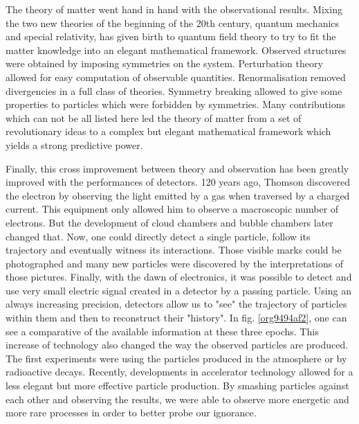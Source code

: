 The theory of matter went hand in hand with the observational results.
Mixing the two new theories of the beginning of the 20th century, quantum mechanics and special relativity, has given birth to quantum field theory to try to fit the matter knowledge into an elegant mathematical framework.
Observed structures were obtained by imposing symmetries on the system.
Perturbation theory allowed for easy computation of observable quantities.
Renormalisation removed divergencies in a full class of theories.
Symmetry breaking allowed to give some properties to particles which were forbidden by symmetries.
Many contributions which can not be all listed here led the theory of matter from a set of revolutionary ideas to a complex but elegant mathematical framework which yields a strong predictive power.

Finally, this cross improvement between theory and observation has been greatly improved with the performances of detectors.
120 years ago, Thomson discovered the electron by observing the light emitted by a gas when traversed by a charged current.
This equipment only allowed him to observe a macroscopic number of electrons.
But the development of cloud chambers and bubble chambers later changed that.
Now, one could directly detect a single particle, follow its trajectory and eventually witness its interactions.
Those visible marks could be photographed and many new particles were discovered by the interpretations of those pictures.
Finally, with the dawn of electronics, it was possible to detect and use very small electric signal created in a detector by a passing particle.
Using an always increasing precision, detectors allow us to "see" the trajectory of particles within them and then to reconstruct their "history".
In fig. \ref{org9494af2}, one can see a comparative of the available information at these three epochs.
This increase of technology also changed the way the observed particles are produced.
The first experiments were using the particles produced in the atmosphere or by radioactive decays.
Recently, developments in accelerator technology allowed for a less elegant but more effective particle production.
By smashing particles against each other and observing the results, we were able to observe more energetic and more rare processes in order to better probe our ignorance.


